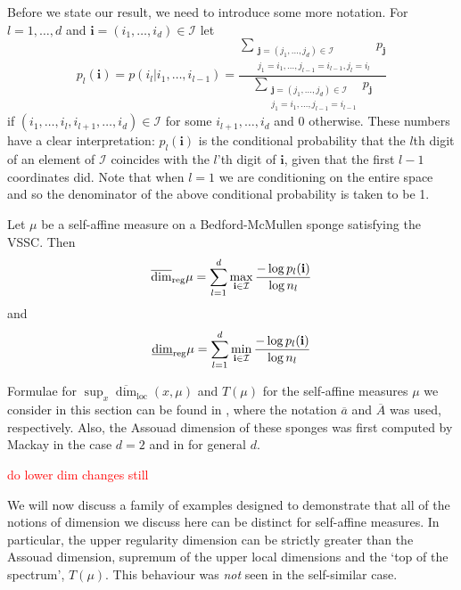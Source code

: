 Before we state our result, we need to introduce some more notation.  For $l=1, \dots, d$ and $\textbf{i}=(i_1, \ldots, i_d)\in \mathcal{I} $  let 
\[
p_l(\mathbf{i})=p (i_l \vert i_1, \ldots , i_{l-1})=\frac{\displaystyle\sum_{\substack{\textbf{j}=\left( j_1, \ldots, j_d\right)\in \mathcal{I} \\ j_1=i_1, \ldots, j_{l-1}=i_{l-1}, j_l=i_l}}p_{\textbf{j}}}{\displaystyle\sum_{\substack{\textbf{j}=\left( j_1, \ldots, j_d\right)\in \mathcal{I} \\ j_1=i_1, \ldots, j_{l-1}=i_{l-1}}}p_{\textbf{j}}}
\]
if $(i_1, \ldots, i_l, i_{l+1},\ldots, i_d) \in \mathcal{I}$ for some $i_{l+1},\ldots, i_d$ and $0$ otherwise.  These numbers have a clear interpretation: $p_l(\mathbf{i})$ is the conditional probability that the $l$th digit of an element of $\mathcal{I}$  coincides with the $l$'th digit of $\mathbf{i}$, given that the first $l-1$ coordinates did.  Note that when $l=1$ we are conditioning on the entire space and so the denominator of the above conditional probability is taken to be 1.


\begin{theorem}\label{ch-upper-reg:carpet}
	Let $\mu$ be a self-affine measure on a Bedford-McMullen sponge satisfying the VSSC.  Then
	\[
	\overline{\dim}_{\textup{reg}} \mu =\sum_{l=1}^d \max_{\mathbf{i}\in \mathcal{I}}\frac{-\log p_l(\mathbf{i})}{\log n_l}
	\]
	and 
	\[
	\underline{\dim}_{\textup{reg}} \mu =\sum_{l=1}^d \min_{\mathbf{i}\in \mathcal{I}}\frac{-\log p_l(\mathbf{i})}{\log n_l}
	\]
\end{theorem}

Formulae for $\sup_x \overline{\dim}_{\text{loc}}(x,\mu)$ and $T(\mu)$ for the self-affine measures $\mu$ we consider in this section can be found in \cite{sponges}, where the notation $\overline{a}$ and $\overline{A}$ was used, respectively.    Also, the Assouad dimension of these sponges was first computed by Mackay \cite{mackay} in the case $d=2$ and in \cite{fraser-howroyd} for general $d$.

\textcolor{red}{do lower dim changes still}


We will now discuss a family of examples designed to demonstrate that all of the notions of dimension we discuss here can be distinct for self-affine measures.  In particular, the upper regularity dimension can be strictly greater than the Assouad dimension, supremum of the upper local dimensions and the `top of the spectrum', $T(\mu)$.  This behaviour was \emph{not} seen in the self-similar case.

